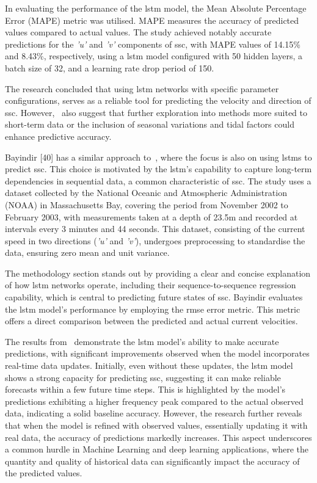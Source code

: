 In evaluating the performance of the \acrshort{lstm} model, the Mean Absolute Percentage Error (MAPE) metric was utilised. MAPE measures the accuracy of predicted values compared to actual values. The study achieved notably accurate predictions for the \textit{'u'} and \textit{'v'} components of \acrshort{ssc}, with MAPE values of 14.15\% and 8.43\%, respectively, using a \acrshort{lstm} model configured with 50 hidden layers, a batch size of 32, and a learning rate drop period of 150.

The research concluded that using \acrshort{lstm} networks with specific parameter configurations, serves as a reliable tool for predicting the velocity and direction of \acrshort{ssc}. However,~\cite{43} also suggest that further exploration into methods more suited to short-term data or the inclusion of seasonal variations and tidal factors could enhance predictive accuracy.

Bayindir [40] has a similar approach to~\cite{43}, where the focus is also on using \acrshort{lstm}s to predict \acrshort{ssc}. This choice is motivated by the \acrshort{lstm}'s capability to capture long-term dependencies in sequential data, a common characteristic of \acrshort{ssc}. The study uses a dataset collected by the National Oceanic and Atmospheric Administration (NOAA) in Massachusetts Bay, covering the period from November 2002 to February 2003, with measurements taken at a depth of 23.5m and recorded at intervals every 3 minutes and 44 seconds. This dataset, consisting of the current speed in two directions (\textit{'u'} and \textit{'v'}), undergoes preprocessing to standardise the data, ensuring zero mean and unit variance.

The methodology section stands out by providing a clear and concise explanation of how \acrshort{lstm} networks operate, including their sequence-to-sequence regression capability, which is central to predicting future states of \acrshort{ssc}. Bayindir evaluates the \acrshort{lstm} model's performance by employing the \acrshort{rmse} error metric. This metric offers a direct comparison between the predicted and actual current velocities. 

The results from~\cite{40} demonstrate the \acrshort{lstm} model's ability to make accurate predictions, with significant improvements observed when the model incorporates real-time data updates. Initially, even without these updates, the \acrshort{lstm} model shows a strong capacity for predicting \acrshort{ssc}, suggesting it can make reliable forecasts within a few future time steps. This is highlighted by the model's predictions exhibiting a higher frequency peak compared to the actual observed data, indicating a solid baseline accuracy. However, the research further reveals that when the model is refined with observed values, essentially updating it with real data, the accuracy of predictions markedly increases. This aspect underscores a common hurdle in Machine Learning and deep learning applications, where the quantity and quality of historical data can significantly impact the accuracy of the predicted values.


